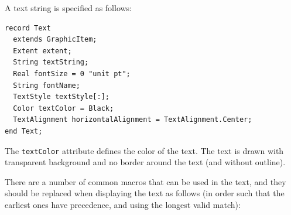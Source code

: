 A text string is specified as follows:
\begin{lstlisting}[language=modelica]
record Text
  extends GraphicItem;
  Extent extent;
  String textString;
  Real fontSize = 0 "unit pt";
  String fontName;
  TextStyle textStyle[:];
  Color textColor = Black;
  TextAlignment horizontalAlignment = TextAlignment.Center;
end Text;
\end{lstlisting}%
The \lstinline!textColor! attribute defines the color of the text.
The text is drawn with transparent background and no border around the text (and without outline).

There are a number of common macros that can be used in the text, and they should be replaced when displaying the text as follows (in order such that the earliest ones have precedence, and using the longest valid match):
